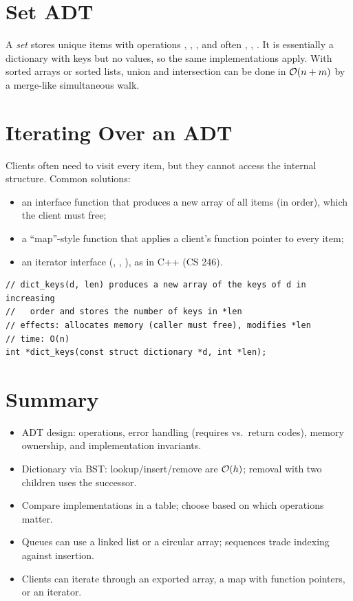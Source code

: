\section{Set ADT}

A \emph{set} stores unique items with operations , , , and
often , , . It is essentially a dictionary with keys but
no values, so the same implementations apply. With sorted arrays or sorted lists, union and
intersection can be done in $\mathcal{O}(n + m)$ by a merge-like simultaneous walk.

\section{Iterating Over an ADT}

Clients often need to visit every item, but they cannot access the internal structure. Common
solutions:
\begin{itemize}
  \item an interface function that produces a new array of all items (in order), which the client
    must free;
  \item a ``map''-style function that applies a client's function pointer to every item;
  \item an iterator interface (, , ), as in C++ (CS 246).
\end{itemize}
\begin{lstlisting}[style=c]
// dict_keys(d, len) produces a new array of the keys of d in increasing
//   order and stores the number of keys in *len
// effects: allocates memory (caller must free), modifies *len
// time: O(n)
int *dict_keys(const struct dictionary *d, int *len);
\end{lstlisting}

\section{Summary}
\begin{itemize}
  \item ADT design: operations, error handling (requires vs.\ return codes), memory ownership,
    and implementation invariants.
  \item Dictionary via BST: lookup/insert/remove are $\mathcal{O}(h)$; removal with two children uses
    the successor.
  \item Compare implementations in a table; choose based on which operations matter.
  \item Queues can use a linked list or a circular array; sequences trade indexing against
    insertion.
  \item Clients can iterate through an exported array, a map with function pointers, or an
    iterator.
\end{itemize}
